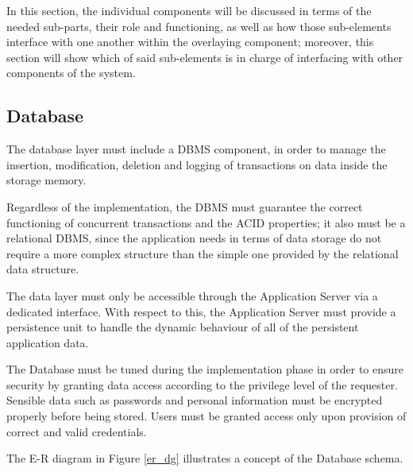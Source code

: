 In this section, the individual components will be discussed in terms of the needed sub-parts, their role and functioning, as well as how those sub-elements interface with one another within the overlaying component; moreover, this section will show which of said sub-elements is in charge of interfacing with other components of the system.

\subsection{Database}
The database layer must include a DBMS component, in order to manage the insertion, modification, deletion and logging of transactions on data inside the storage memory.

Regardless of the implementation, the DBMS must guarantee the correct functioning of concurrent transactions and the ACID properties; it also must be a relational DBMS, since the application needs in terms of data storage do not require a more complex structure than the simple one provided by the relational data structure.

The data layer must only be accessible through the Application Server via a dedicated interface. With respect to this, the Application Server must provide a persistence unit to handle the dynamic behaviour of all of the persistent application data.

The Database must be tuned during the implementation phase in order to ensure security by granting data access according to the privilege level of the requester. Sensible data such as passwords and personal information must be encrypted properly before being stored. Users must be granted access only upon provision of correct and valid credentials.

The E-R diagram in Figure \ref{er_dg} illustrates a concept of the Database schema.

